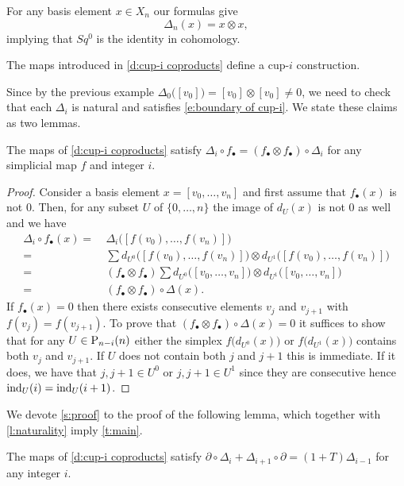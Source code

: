 \begin{example} \label{e:Sq0 is the identity}
	For any basis element $x \in X_n$ our formulas give
	\begin{equation*}
	\Delta_n(x) = x \otimes x,
	\end{equation*}
	implying that $Sq^0$ is the identity in cohomology.
\end{example}

\begin{theorem} \label{t:main}
	The maps introduced in \cref{d:cup-i coproducts} define a cup-$i$ construction.
\end{theorem}

Since by the previous example $\Delta_0\big([v_0]\big) = [v_0] \otimes [v_0] \neq 0$, we need to check that each $\Delta_i$ is natural and satisfies \eqref{e:boundary of cup-i}.
We state these claims as two lemmas.

\begin{lemma} \label{l:naturality}
	The maps of \cref{d:cup-i coproducts} satisfy $\Delta_i \circ f_\bullet = (f_\bullet \otimes f_\bullet) \circ \Delta_i$ for any simplicial map $f$ and integer $i$.
\end{lemma}

\begin{proof}
	Consider a basis element $x = [v_0, \dots, v_n]$ and first assume that $f_\bullet(x)$ is not $0$.
	Then, for any subset $U$ of $\{0, \dots, n\}$ the image of $d_U(x)$ is not $0$ as well and we have
	\begin{align*}
	\Delta_i \circ f_\bullet(x) =\ &
	\Delta_i \big([f(v_0), \dots, f(v_n)]\big) \\ =\ &
	\sum d_{U^0} \big([f(v_0), \dots, f(v_n)]\big) \otimes d_{U^1} \big([f(v_0), \dots, f(v_n)]\big) \\ =\ &
	(f_\bullet \otimes f_\bullet) \sum d_{U^0} \big([v_0, \dots, v_n]\big) \otimes d_{U^1} \big([v_0, \dots, v_n]\big) \\ =\ &
	(f_\bullet \otimes f_\bullet) \circ \Delta(x).
	\end{align*}
	If $f_\bullet(x) = 0$ then there exists consecutive elements $v_j$ and $v_{j+1}$ with $f(v_j) = f(v_{j+1})$.
	To prove that $(f_\bullet \otimes f_\bullet) \circ \Delta(x) = 0$ it suffices to show that for any $U \in \P_{n-i}(n)$ either the simplex $f \big(d_{U^0}(x) \big)$ or $f \big( d_{U^1}(x) \big)$ contains both $v_j$ and $v_{j+1}$.
	If $U$ does not contain both $j$ and $j+1$ this is immediate.
	If it does, we have that $j, j+1 \in U^0$ or $j, j+1 \in U^1$ since they are consecutive hence $\ind_U(i) = \ind_U(i+1)$.
\end{proof}

We devote \cref{s:proof} to the proof of the following lemma, which together with \cref{l:naturality} imply \cref{t:main}.

\begin{lemma} \label{l:main}
	The maps of \cref{d:cup-i coproducts} satisfy $\partial \circ \Delta_{i} + \Delta_{i+1} \circ \partial = (1+T) \Delta_{i-1}$ for any integer $i$.
\end{lemma}